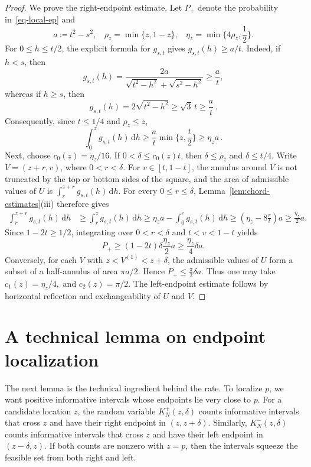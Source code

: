 \documentclass[ECP,preprint]{ejpecp} %
\newcommand{\1}{\mathbf 1}
\renewcommand{\d}{\mathrm d}
\begin{document}
\begin{proof}
We prove the right-endpoint estimate. Let \(P_+\) denote the probability in~\eqref{eq-local-ep} and
\[
    a \coloneqq t^2-s^2,
    ~~~~
    \rho_z = \min\{z,1-z\},
    ~~~~
    \eta_z=\min\Big\{4\rho_z,\frac12\Big\}.
\]
For \(0\le h\le t/2\), the explicit formula for \(g_{s,t}\) gives
\(
    g_{s,t}(h)\ge {a}/{t}.
\)
Indeed, if \(h<s\), then
\[
    g_{s,t}(h)
    =
    \frac{2a}{
        \sqrt{t^2-h^2}+\sqrt{s^2-h^2}
    }
    \ge\frac{a}{t},
\]
whereas if \(h\ge s\), then
\[
    g_{s,t}(h)
    =
    2\sqrt{t^2-h^2}
    \ge\sqrt{3}\,t
    \ge\frac{a}{t} \, .
\]
Consequently, since \(t\le1/4\) and \(\rho_z\le z\),
\[
    \int_0^z g_{s,t}(h)\,\d h
    \ge
    \frac{a}{t}\min\Big\{z,\frac t2\Big\}
    \ge
    \eta_z a \, .
\]
%
Next, choose
\(
    c_0(z)= {\eta_z}/{16}.
\)
If \(0<\delta\le c_0(z)t\), then \(\delta\le\rho_z\) and
\(\delta\le t/4\). Write \(V=(z+r,v)\), where \(0<r<\delta\).
For \(v\in[t,1-t]\), the annulus around \(V\) is not truncated by
the top or bottom sides of the square, and the area of admissible
values of \(U\) is
\(
    \int_r^{z+r}g_{s,t}(h)\,\d h.
\)
For every \(0\le r\le\delta\), Lemma~\ref{lem:chord-estimates}(iii)
therefore gives
\[
\begin{aligned}
    \int_r^{z+r}g_{s,t}(h)\,\d h
    &\ge
    \int_r^z g_{s,t}(h)\,\d h 
    \ge
    \eta_z a-\int_0^r g_{s,t}(h)\,\d h 
    \ge
    \left(\eta_z-8\frac{r}{t}\right)a
    \ge
    \frac{\eta_z}{2}a.
\end{aligned}
\]
Since \(1-2t\ge1/2\), integrating over
\(0<r<\delta\) and \(t<v<1-t\) yields
\[
    P_+
    \ge
    (1-2t)\delta\frac{\eta_z}{2}a
    \ge
    \frac{\eta_z}{4}\delta a.
\]
%
Conversely, for each \(V\) with \(z<V^{(1)}<z+\delta\), the admissible values of \(U\) form a subset of a half-annulus of area \(\pi a/2\). Hence
\(
    P_+
    \le
    \frac{\pi}{2}\delta a.
\)
Thus one may take
\(
    c_1(z)={\eta_z}/{4},
\)
and
\(
    c_2(z)={\pi}/{2}.
\)
The left-endpoint estimate follows by horizontal reflection and exchangeability of \(U\) and \(V\).
\end{proof}

\section{A technical lemma on endpoint localization}

The next lemma is the technical ingredient behind the rate.  To localize \(p\), we want positive informative intervals whose endpoints lie very close to \(p\).  For a candidate location \(z\), the random variable \(K_N^+(z,\delta)\) counts informative intervals that cross \(z\) and have their right endpoint in \((z,z+\delta)\).  Similarly, \(K_N^-(z,\delta)\) counts informative intervals that cross \(z\) and have their left endpoint in \((z-\delta,z)\).  If both counts are nonzero with \(z=p\), then the intervals squeeze the feasible set from both right and left.
\end{document}
